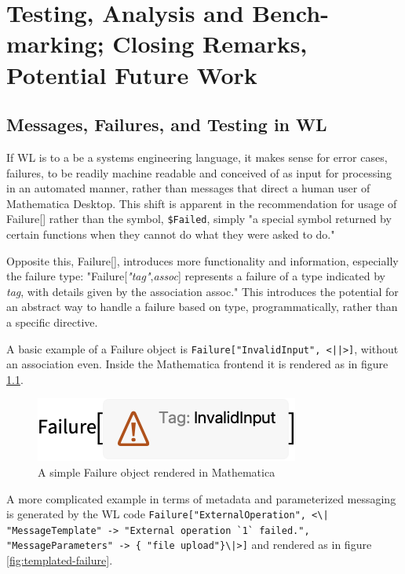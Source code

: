 \chapter[Closing Words]{Testing, Analysis and Bench-marking; Closing Remarks, Potential Future Work}
\label{cha:Closing}

\section{Messages, Failures, and Testing in WL} \label{closing:messages}

If WL is to a be a systems engineering language, it makes sense for error cases, failures, to be readily machine readable and conceived of as input for processing in an automated manner, rather than messages that direct a human user of Mathematica Desktop. This shift is apparent in the recommendation for usage of Failure[] rather than the symbol, \lstinline+$Failed+, simply "a special symbol returned by certain functions when they cannot do what they were asked to do." \cite{noauthor_failedwolfram_nodate}

Opposite this, Failure[], introduces more functionality and information, especially the failure type: "Failure[\textit{"tag"},\textit{assoc}] represents a failure of a type indicated by \textit{tag}, with details given by the association assoc." \cite{noauthor_failurewolfram_nodate} This introduces the potential for an abstract way to handle a failure based on type, programmatically, rather than a specific directive.

A basic example of a Failure object is \lstinline+Failure["InvalidInput", <||>]+, without an association even. Inside the Mathematica frontend it is rendered as in figure \ref{fig:simple-failure}.

\begin{figure}[h]
    \centering
    \includegraphics[scale=0.5]{images/closing/O_4.png}
    \caption{A simple Failure object rendered in Mathematica \cite{noauthor_failurewolfram_nodate}}
    \label{fig:simple-failure}
\end{figure}

A more complicated example in terms of metadata and parameterized messaging is generated by the WL code \lstinline$Failure["ExternalOperation", <\|
  "MessageTemplate" -> "External operation `1` failed.", 
  "MessageParameters" -> { "file upload"}\|>]$ and rendered as in figure \ref{fig:templated-failure}.

